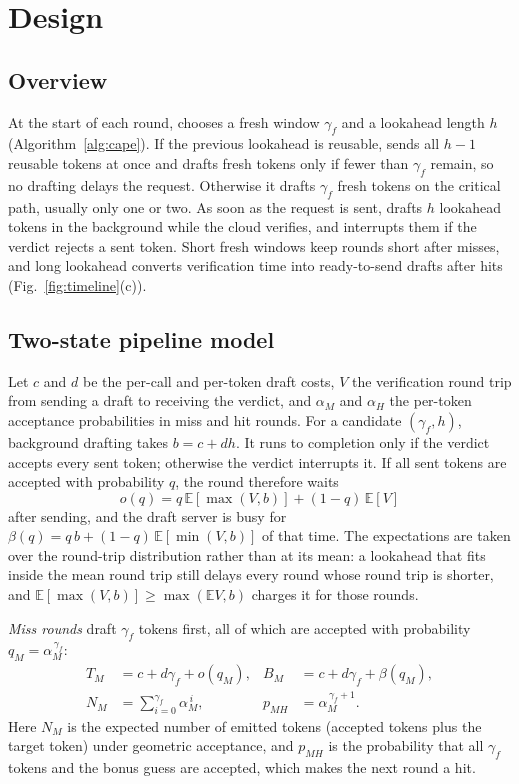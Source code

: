 \section{\cape{} Design}
\label{sec:design}

\subsection{Overview}
At the start of each round, \cape{} chooses a fresh window $\gamma_f$ and a lookahead length $h$ (Algorithm~\ref{alg:cape}). If the previous lookahead is reusable, \cape{} sends all $h-1$ reusable tokens at once and drafts fresh tokens only if fewer than $\gamma_f$ remain, so no drafting delays the request. Otherwise it drafts $\gamma_f$ fresh tokens on the critical path, usually only one or two. As soon as the request is sent, \cape{} drafts $h$ lookahead tokens in the background while the cloud verifies, and interrupts them if the verdict rejects a sent token. Short fresh windows keep rounds short after misses, and long lookahead converts verification time into ready-to-send drafts after hits (Fig.~\ref{fig:timeline}(c)).

\subsection{Two-state pipeline model}
Let $c$ and $d$ be the per-call and per-token draft costs, $V$ the verification round trip from sending a draft to receiving the verdict, and $\alpha_M$ and $\alpha_H$ the per-token acceptance probabilities in miss and hit rounds. For a candidate $(\gamma_f,h)$, background drafting takes $b=c+dh$. It runs to completion only if the verdict accepts every sent token; otherwise the verdict interrupts it. If all sent tokens are accepted with probability $q$, the round therefore waits
\begin{equation}
o(q)=q\,\mathbb{E}[\max(V,b)]+(1-q)\,\mathbb{E}[V]\label{eq:wait}
\end{equation}
after sending, and the draft server is busy for $\beta(q)=q\,b+(1-q)\,\mathbb{E}[\min(V,b)]$ of that time. The expectations are taken over the round-trip distribution rather than at its mean: a lookahead that fits inside the mean round trip still delays every round whose round trip is shorter, and $\mathbb{E}[\max(V,b)]\ge\max(\mathbb{E}V,b)$ charges it for those rounds.

\emph{Miss rounds} draft $\gamma_f$ tokens first, all of which are accepted with probability $q_M=\alpha_M^{\,\gamma_f}$:
\begin{align}
T_M &= c+d\gamma_f+o(q_M), & B_M &= c+d\gamma_f+\beta(q_M),\nonumber\\
N_M &= \textstyle\sum_{i=0}^{\gamma_f}\alpha_M^{\,i}, & p_{MH} &= \alpha_M^{\,\gamma_f+1}.\label{eq:miss}
\end{align}
Here $N_M$ is the expected number of emitted tokens (accepted tokens plus the target token) under geometric acceptance, and $p_{MH}$ is the probability that all $\gamma_f$ tokens and the bonus guess are accepted, which makes the next round a hit.

